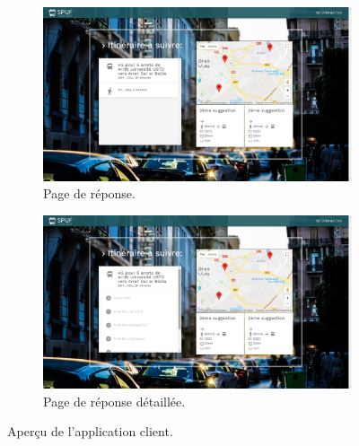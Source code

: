 \begin{figure}
	 \begin{subfigure}[b]{\linewidth}
	 	\includegraphics[width=\linewidth]{img/spuf/response.png}
	 	\caption{Page de réponse.}
	 \end{subfigure}
	 
	 \begin{subfigure}[b]{\linewidth}
	 	\includegraphics[width=\linewidth]{img/spuf/response2.png}
	 	\caption{Page de réponse détaillée.}	 
	 \end{subfigure}
	 \caption{Aperçu de l'application client.}
	 \label{fig:clientInterface2}
\end{figure}

